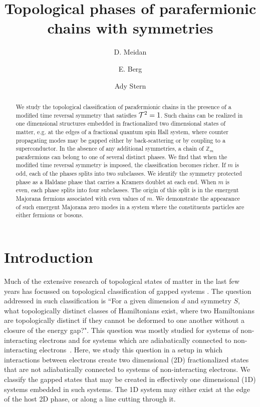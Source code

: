 \documentclass[twocolumn,aps,prb,showpacs]{revtex4-1}
\begin{document}
\title{Topological phases of parafermionic chains with symmetries}

\author{D. Meidan}
\author{E. Berg}
\author{Ady Stern}
\begin{abstract}
We study the topological classification of parafermionic chains in the presence of a modified time reversal symmetry that satisfies ${\cal T}^2=1 $.
Such chains can be realized in one dimensional  structures embedded in fractionalized two dimensional states of matter, e.g. at the edges of a fractional quantum spin Hall system, where counter propagating modes  may be gapped either by back-scattering or by coupling to a superconductor.
In the absence of any additional symmetries, a chain of $\mathbb{Z}_m$ parafermions can belong to one of several distinct phases.
We find that when the modified time reversal symmetry is imposed, the classification becomes richer. If $m $ is odd, each of the  phases  splits into two  subclasses. We identify the symmetry protected phase as a Haldane phase that carries a Kramers doublet at each end.  When $m $ is even, each phase splits into four subclasses.
The origin of this split is in the emergent Majorana fermions associated with even values of $m$. We demonstrate the appearance of such emergent Majorana zero modes in a system where the constituents particles are either fermions or bosons.
\end{abstract}

\maketitle


\section{Introduction}
Much of the extensive research of topological states of matter in the last few years has focussed on topological classification of gapped systems \cite{Schnyder2008,Kitaev2009,Schnyder2010}. The question addressed in such classification is ``For a given dimension $d$ and symmetry $S$, what topologically distinct classes of Hamiltonians exist, where two Hamiltonians are topologically distinct if they cannot be deformed to one another without a closure of the energy gap?". This question was mostly studied for systems of non-interacting electrons and for systems which are adiabatically connected to non-interacting electrons~\cite{Fidkowski2010,Turner2011,Fidkowski2011a}. Here, we study this question in a setup in which interactions between electrons create two dimensional (2D) fractionalized states that are not adiabatically connected to systems of non-interacting electrons. We classify the gapped states that may be created in effectively one dimensional (1D) systems embedded in such systems. The 1D system may either exist at the edge of the host 2D phase, or along a line cutting through it.
\end{document}
